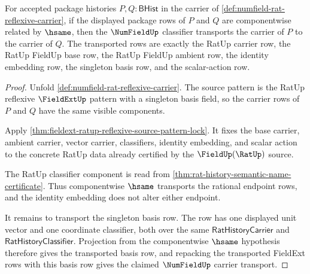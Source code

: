 \begin{theorem}
\label{thm:numfield-rat-reflexive-classifier-transport}
For accepted package histories $P,Q:\mathsf{BHist}$ in the carrier of
\autoref{def:numfield-rat-reflexive-carrier}, if the displayed package rows of
$P$ and $Q$ are componentwise related by $\hsame$, then the $\NumFieldUp$
classifier transports the carrier of $P$ to the carrier of $Q$. The transported
rows are exactly the RatUp carrier row, the RatUp FieldUp base row, the RatUp
FieldUp ambient row, the identity embedding row, the singleton basis row, and
the scalar-action row.
\end{theorem}
\begin{proof}
Unfold \autoref{def:numfield-rat-reflexive-carrier}. The source pattern is the
RatUp reflexive $\FieldExtUp$ pattern with a singleton basis field, so the
carrier rows of $P$ and $Q$ have the same visible components.

Apply
\autoref{thm:fieldext-ratup-reflexive-source-pattern-lock}. It fixes the base
carrier, ambient carrier, vector carrier, classifiers, identity embedding, and
scalar action to the concrete RatUp data already certified by the
$\FieldUp(\RatUp)$ source.

The RatUp classifier component is read from
\autoref{thm:rat-history-semantic-name-certificate}. Thus componentwise
$\hsame$ transports the rational endpoint rows, and the identity embedding
does not alter either endpoint.

It remains to transport the singleton basis row. The row has one displayed
unit vector and one coordinate classifier, both over the same
$\mathsf{RatHistoryCarrier}$ and $\mathsf{RatHistoryClassifier}$. Projection
from the componentwise $\hsame$ hypothesis therefore gives the transported
basis row, and repacking the transported FieldExt rows with this basis row
gives the claimed $\NumFieldUp$ carrier transport.
\end{proof}

